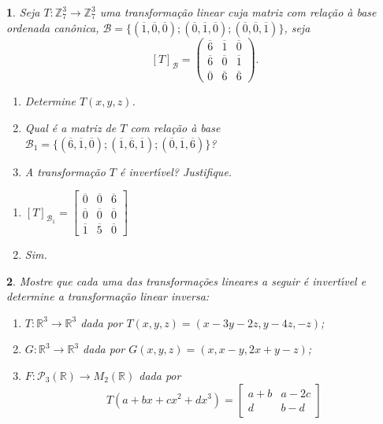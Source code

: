 \documentclass[12pt]{exam}
\newtheorem{exercicio}{}
\newcommand{\integer}{\mathbb{Z}}
\newcommand{\real}{\mathbb{R}}
\begin{document}
\begin{exercicio}
  Seja $T : \integer_7^3 \to \integer_7^3$ uma transforma\c{c}\~ao linear cuja matriz com rela\c{c}\~ao \`a base ordenada can\^onica, $\mathcal{B} = \{(\overline{1}, \overline{0}, \overline{0}); (\overline{0}, \overline{1}, \overline{0}); (\overline{0}, \overline{0}, \overline{1})\}$, seja
  \[
    [T]_\mathcal{B} = \begin{pmatrix}
      \overline{6} & \overline{1} & \overline{0}\\
      \overline{6} & \overline{0} & \overline{1}\\
      \overline{0} & \overline{6} & \overline{6}
    \end{pmatrix}.
  \]
    \begin{enumerate}[label=({\alph*})]
      \item Determine $T(x,y,z)$.
      \item Qual \'e a matriz de $T$ com rela\c{c}\~ao \`a base $\mathcal{B}_1 = \{(\overline{6},\overline{1},\overline{0});(\overline{1},\overline{6},\overline{1});(\overline{0},\overline{1},\overline{6})\}$?
      \item A transforma\c{c}\~ao $T$ \'e invert{\'\i}vel? Justifique.
    \end{enumerate}
    \begin{solucao}
      \begin{enumerate}
        \item[b)] $[T]_{\mathcal{B}_1} = \begin{bmatrix}
          \overline{0} & \overline{0} & \overline{6}\\
          \overline{0} & \overline{0} & \overline{0}\\
          \overline{1} & \overline{5} & \overline{0}
        \end{bmatrix}$
        \item[c)] Sim.
      \end{enumerate}
    \end{solucao}
\end{exercicio}

\begin{exercicio}
  Mostre que cada uma das transforma\c{c}\~oes lineares a seguir \'e invert{\'\i}vel e determine a transforma\c{c}\~ao linear inversa:
  \begin{enumerate}[label=({\alph*})]
    \item $T : \real^3 \to \real^3$ dada por $T(x,y,z) = (x - 3y - 2z, y - 4z, -z)$;
    \item $G : \real^3 \to \real^3$ dada por $G(x,y,z) = (x, x - y, 2x + y -z)$;
    \item $F : \mathcal{P}_3(\real) \to M_2(\real)$ dada por
    \[
      T(a + bx + cx^2 + dx^3) = \begin{bmatrix}
        a + b & a - 2c\\
        d & b - d
      \end{bmatrix}
    \]
  \end{enumerate}
\end{exercicio}
\end{document}
